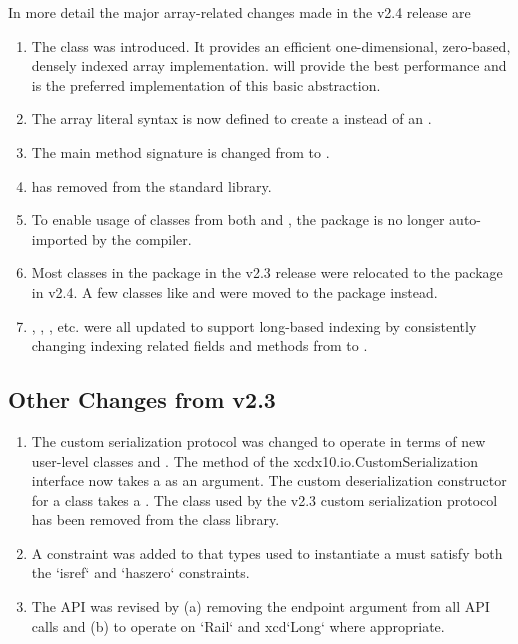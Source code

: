 In more detail the major array-related changes made in the \Xten{}
v2.4 release are 
\begin{enumerate}
\item The class  was introduced.  It provides
  an efficient one-dimensional, zero-based, densely indexed array
  implementation.  will provide the best performance and is
  the preferred implementation of this basic abstraction. 
\item The array literal syntax \xcd{[1,2,3]} is now defined to create
  a  instead of an . 
\item The main method signature is changed from  to
  . 
\item {} has removed from the \Xten{}
  standard library.
\item To enable usage of classes from both  and
  , the package  is no longer
  auto-imported by the \Xten{} compiler.
\item Most classes in the  package in the \Xten{} v2.3
  release were relocated to the  package in
  v2.4. A few classes like  and  were moved
  to the  package instead.
\item {}, , , etc. were all updated to
  support long-based indexing by consistently changing indexing
  related fields and methods from  to . 
\end{enumerate}

\subsection{Other Changes from \Xten{} v2.3}

\begin{enumerate}
\item The custom serialization protocol was changed to operate in
  terms of new user-level classes  and
  .  The  method of
  the xcd{x10.io.CustomSerialization} interface now takes a
   as an argument.  The custom deserialization
  constructor for a class takes a . The
   class used by the \Xten{} v2.3 custom
  serialization protocol has been removed from the class library. 

\item A constraint was added to  that types used
  to instantiate a  must satisfy both the
  \xcd`isref` and \xcd`haszero` constraints.

\item The  API was revised by (a) removing the
  endpoint argument from all API calls and (b) to operate on \xcd`Rail` and
  xcd`Long` where appropriate.
\end{enumerate}

